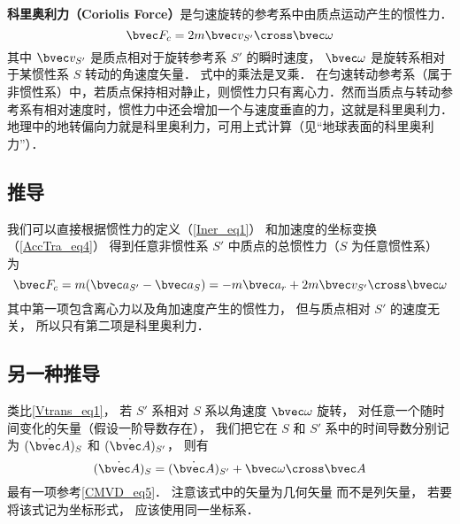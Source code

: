 

\textbf{科里奥利力（Coriolis Force）}是匀速旋转的参考系中由质点运动产生的惯性力．
\begin{equation}
\bvec F_c = 2m \bvec v_{S'} \cross \bvec \omega
\end{equation}
其中 $\bvec v_{S'}$ 是质点相对于旋转参考系 $S'$ 的瞬时速度， $\bvec\omega$ 是旋转系相对于某惯性系 $S$ 转动的角速度矢量．%
式中的乘法是叉乘．
在匀速转动参考系（属于非惯性系）中，若质点保持相对静止，则惯性力只有离心力．然而当质点与转动参考系有相对速度时，惯性力中还会增加一个与速度垂直的力，这就是科里奥利力．地理中的地转偏向力就是科里奥利力，可用上式计算（见“地球表面的科里奥利力”）．

\subsection{推导}
我们可以直接根据惯性力的定义（\autoref{Iner_eq1}） 和加速度的坐标变换（\autoref{AccTra_eq4}） 得到任意非惯性系 $S'$ 中质点的总惯性力（$S$ 为任意惯性系） 为
\begin{equation}
\bvec F_c = m( \bvec a_{S'} - \bvec a_{S} ) = -m\bvec a_{r} + 2 m \bvec v_{S'} \cross  \bvec \omega
\end{equation}
其中第一项包含离心力以及角加速度产生的惯性力， 但与质点相对 $S'$ 的速度无关， 所以只有第二项是科里奥利力．

\subsection{另一种推导}
类比\autoref{Vtrans_eq1}， 若 $S'$ 系相对 $S$ 系以角速度 $\bvec\omega$ 旋转， 对任意一个随时间变化的矢量（假设一阶导数存在）， 我们把它在 $S$ 和 $S'$ 系中的时间导数分别记为 $(\dot{\bvec A})_{S}$ 和 $(\dot{\bvec A})_{S'}$， 则有
\begin{equation}\label{Corio_eq4}
(\dot{\bvec A})_{S} = (\dot{\bvec A})_{S'} + \bvec\omega\cross\bvec A
\end{equation}
最有一项参考\autoref{CMVD_eq5}． 注意该式中的矢量为几何矢量 而不是列矢量， 若要将该式记为坐标形式， 应该使用同一坐标系．

